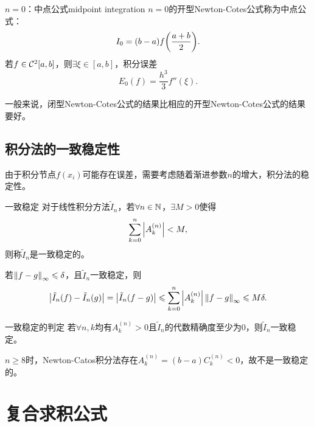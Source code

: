 \begin{example}
    {$n=0$：中点公式}{midpoint integration}
    $n=0$的开型Newton-Cotes公式称为中点公式：
    \begin{equation}
        \label{eqn:midpoint integration}
        I_0=(b-a)f\biggl(\frac{a+b}2\biggr).
    \end{equation}
    若$f\in\mathcal C^2[a,b]$，则$\exists\xi\in[a,b]$，积分误差
    \begin{equation}
        \label{eqn:midpoint error}
        E_0(f)=\frac{h^3}3f''(\xi).
    \end{equation}
\end{example}

\begin{remark}
    一般来说，闭型Newton-Cotes公式的结果比相应的开型Newton-Cotes公式的结果要好。
\end{remark}

\subsection{积分法的一致稳定性}

由于积分节点$f(x_i)$可能存在误差，需要考虑随着渐进参数$n$的增大，积分法的稳定性。

\begin{definition}
    {一致稳定}{}
    对于线性积分方法$\tilde I_n$，若$\forall n\in\mathbb N$，$\exists M>0$使得
    \begin{equation}
        \sum_{k=0}^n\left\lvert A_k^{(n)}\right\rvert<M,
    \end{equation}
    则称$\tilde I_n$是一致稳定的。
\end{definition}

\begin{corollary}
    若$\left\lVert f-g\right\rVert_\infty\leqslant\delta$，且$\tilde I_n$一致稳定，则
    \[
        \left\lvert\tilde I_n(f)-\tilde I_n(g)\right\rvert=\left\lvert\tilde I_n(f-g)\right\rvert\leqslant\sum_{k=0}^n\left\lvert A_k^{(n)}\right\rvert\left\lVert f-g\right\rVert_\infty\leqslant M\delta.
    \]
\end{corollary}

\begin{theorem}
    {一致稳定的判定}{}
    若$\forall n,k$均有$A_k^{(n)}>0$且$\tilde I_n$的代数精确度至少为0，则$\tilde I_n$一致稳定。
\end{theorem}

\begin{remark}
    $n\geq 8$时，Newton-Catos积分法存在$A_k^{(n)}=(b-a)C_k^{(n)}<0$，故不是一致稳定的。
\end{remark}

\section{复合求积公式}
\label{sec:composite quadrature rule}

